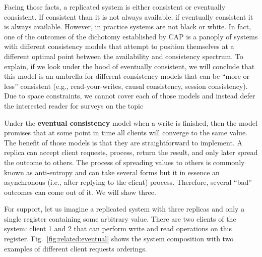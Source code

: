 Facing those facts, a replicated system is either consistent or eventually consistent. 
If consistent than it is not always available; if eventually consistent it is always available. 
However, in practice systems are not black or white. 
In fact, one of the outcomes of the dichotomy established by CAP is a panoply of systems with different consistency models that attempt to position themselves at a different optimal point between  the availability and consistency spectrum. 
To explain, if we look under the hood of eventually consistent, we will conclude that  this model is an umbrella for different consistency models that can be ``more or less'' consistent (e.g., read-your-writes, causal consistency, session consistency). 
Due to space constraints, we cannot cover each of those models and instead defer the interested reader for surveys on the topic \cite{bailis2013eventual, bailis2013eventual}




Under the \textbf{eventual consistency} model when a write is finished, then the model promises that at some point in time all clients will converge to the same value. 
The benefit of  those models is that they are straightforward to implement. 
A replica can accept client requests, process, return the result,  and only later spread the outcome to others. 
The process of spreading values to others is commonly known as anti-entropy and can take several forms but it in essence an asynchronous (i.e., after replying to the client) process. 
Therefore, several ``bad'' outcomes can come out of it. 
We will show three. 

For support, let us imagine a replicated system with three replicas and only a single register containing some arbitrary value. There are two clients of the system: client 1 and 2 that can perform write and read operations on this register. Fig.~\ref{fig:related:eventual} shows the system composition with two examples of different client requests orderings. 



